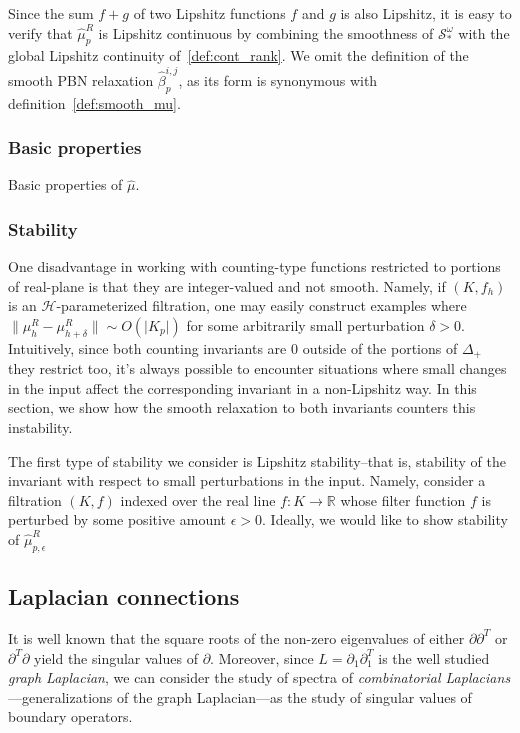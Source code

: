 \documentclass[10pt]{article}
\numberwithin{equation}{section}
\newcommand{\+}{%
	\raisebox{0.18ex}{\scaleobj{0.55}{+}}
}
\theoremstyle{definition}
\begin{document}
\noindent Since the sum $f + g$ of two Lipshitz functions $f$ and $g$ is also Lipshitz, it is easy to verify that $\hat{\mu}_p^R$ is Lipshitz continuous by combining the smoothness of $\mathcal{S}_\ast^\omega$ with the global Lipshitz continuity of~\eqref{def:cont_rank}. We omit the definition of the smooth PBN relaxation $\hat{\beta}_p^{i,j}$, as its form is synonymous with definition~\ref{def:smooth_mu}.

\subsubsection*{Basic properties}

Basic properties of $\hat{\mu}$. %



\subsubsection*{Stability}
One disadvantage in working with counting-type functions restricted to portions of real-plane is that they are integer-valued and not smooth. 
Namely, if $(K, f_h)$ is an $\mathcal{H}$-parameterized filtration, one may easily construct examples where $\lVert \mu_h^R - \mu_{h + \delta}^R \rVert \sim O(\lvert K_p \rvert )$ for some arbitrarily small perturbation $\delta > 0$. 
Intuitively, since both counting invariants are $0$ outside of the portions of $\Delta_+$ they restrict  too, it's always possible to encounter situations where small changes in the input affect the corresponding invariant in a non-Lipshitz way. In this section, we show how the smooth relaxation to both invariants counters this instability. 

The first type of stability we consider is Lipshitz stability--that is, stability of the invariant with respect to small perturbations in the input. Namely, consider a filtration $(K, f)$ indexed over the real line $f : K \to \mathbb{R}$ whose filter function $f$ is perturbed by some positive amount $\epsilon > 0$. Ideally, we would like to show stability of $\hat{\mu}_{p,\epsilon}^R$


\subsection{Laplacian connections}
It is well known that the square roots of the non-zero eigenvalues of either $\partial \partial^T$ or $\partial^T \partial$ yield the singular values of $\partial$. 
Moreover, since $L = \partial_1 \partial_1^T$ is the well studied \emph{graph Laplacian}, we can consider the study of spectra of \emph{combinatorial Laplacians}---generalizations of the graph Laplacian---as the study of singular values of boundary operators.
\end{document}
